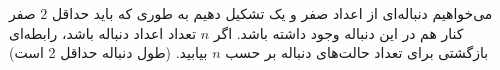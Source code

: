 \p
    می‌خواهیم دنباله‌ای از اعداد صفر و یک تشکیل دهیم به طوری که باید حداقل 
    $2$
    صفر کنار هم در این دنباله وجود داشته باشد.
    اگر
   $ n $
   تعداد اعداد دنباله‌ باشد،
   رابطه‌ای بازگشتی برای تعداد حالت‌های دنباله بر حسب
   $ n $
   بیابید.
    (طول دنباله حداقل 2 است)